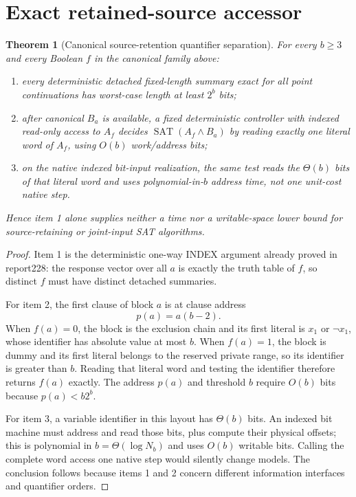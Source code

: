 \documentclass[11pt]{article}
\newtheorem{theorem}{Theorem}
\begin{document}
\section{Exact retained-source accessor}
\begin{theorem}[Canonical source-retention quantifier separation]
For every $b\ge3$ and every Boolean $f$ in the canonical family above:
\begin{enumerate}
\item every deterministic detached fixed-length summary exact for all point
continuations has worst-case length at least $2^b$ bits;
\item after canonical $B_a$ is available, a fixed deterministic controller
with indexed read-only access to $A_f$ decides
$\operatorname{SAT}(A_f\wedge B_a)$ by reading exactly one literal word of
$A_f$, using $O(b)$ work/address bits;
\item on the native indexed bit-input realization, the same test reads the
$\Theta(b)$ bits of that literal word and uses polynomial-in-$b$ address time,
not one unit-cost native step.
\end{enumerate}
Hence item 1 alone supplies neither a time nor a writable-space lower bound for
source-retaining or joint-input SAT algorithms.
\end{theorem}

\begin{proof}
Item 1 is the deterministic one-way INDEX argument already proved in report228:
the response vector over all $a$ is exactly the truth table of $f$, so distinct
$f$ must have distinct detached summaries.

For item 2, the first clause of block $a$ is at clause address
\[
 p(a)=a(b-2).
\]
When $f(a)=0$, the block is the exclusion chain and its first literal is
$x_1$ or $\neg x_1$, whose identifier has absolute value at most $b$.  When
$f(a)=1$, the block is dummy and its first literal belongs to the reserved
private range, so its identifier is greater than $b$.  Reading that literal
word and testing the identifier therefore returns $f(a)$ exactly.  The
address $p(a)$ and threshold $b$ require $O(b)$ bits because
$p(a)<b2^b$.

For item 3, a variable identifier in this layout has $\Theta(b)$ bits.
An indexed bit machine must address and read those bits, plus compute their
physical offsets; this is polynomial in $b=\Theta(\log N_b)$ and uses $O(b)$
writable bits.  Calling the complete word access one native step would silently
change models.  The conclusion follows because items 1 and 2 concern different
information interfaces and quantifier orders.
\end{proof}
\end{document}
